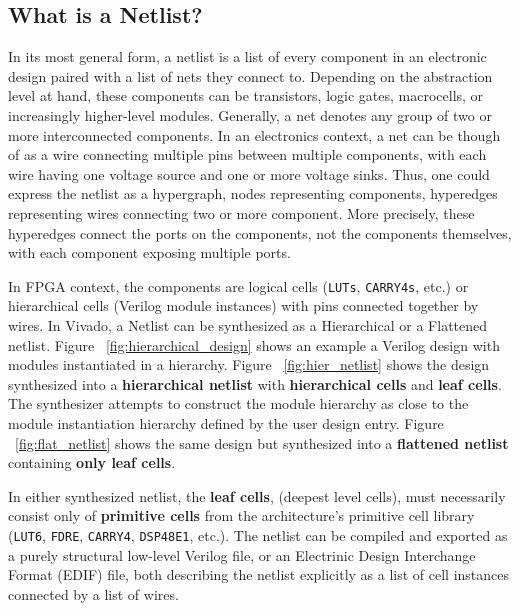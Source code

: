 \subsection{What is a Netlist?}
\label{subsec:netlist}
In its most general form, a netlist is a list of every component in an electronic design paired with a list of nets they connect to. 
Depending on the abstraction level at hand, these components can be transistors, logic gates, macrocells, or increasingly higher-level modules. 
Generally, a net denotes any group of two or more interconnected components.
In an electronics context, a net can be though of as a wire connecting multiple pins between multiple components, with each wire having one voltage source and one or more voltage sinks. 
Thus, one could express the netlist as a hypergraph, nodes representing components, hyperedges representing wires connecting two or more component. 
More precisely, these hyperedges connect the ports on the components, not the components themselves, with each component exposing multiple ports. 

In FPGA context, the components are logical cells (\texttt{LUTs}, \texttt{CARRY4s}, etc.) or hierarchical cells (Verilog module instances) with pins connected together by wires. 
In Vivado, a Netlist can be synthesized as a Hierarchical or a Flattened netlist. 
Figure ~\ref{fig:hierarchical_design} shows an example a Verilog design with modules instantiated in a hierarchy. 
Figure ~\ref{fig:hier_netlist} shows the design synthesized into a \textbf{hierarchical netlist} with \textbf{hierarchical cells} and \textbf{leaf cells}. 
The synthesizer attempts to construct the module hierarchy as close to the module instantiation hierarchy defined by the user design entry. 
Figure ~\ref{fig:flat_netlist} shows the same design but synthesized into a \textbf{flattened netlist} containing \textbf{only leaf cells}. 

In either synthesized netlist, the \textbf{leaf cells}, (deepest level cells), must necessarily consist only of \textbf{primitive cells} from the architecture's primitive cell library (\texttt{LUT6}, \texttt{FDRE}, \texttt{CARRY4}, \texttt{DSP48E1}, etc.). 
The netlist can be compiled and exported as a purely structural low-level Verilog file, or an Electrinic Design Interchange Format (EDIF) file, both describing the netlist explicitly as a list of cell instances connected by a list of wires. 

